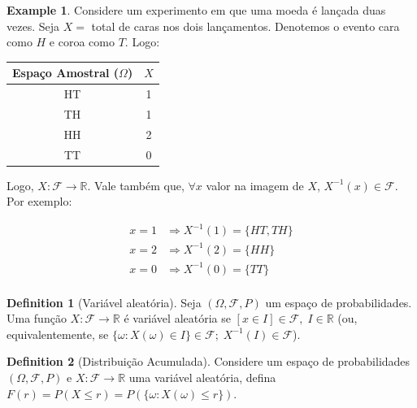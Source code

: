 \documentclass[
]{article}
\theoremstyle{definition}
\newtheorem{definition}{Definition}[section]
\theoremstyle{definition}
\newtheorem{example}{Example}[section]
\theoremstyle{definition}
\theoremstyle{definition}
\theoremstyle{remark}
\begin{document}
\begin{example}
Considere um experimento em que uma moeda é lançada duas vezes. Seja \(X =\) total de caras nos dois lançamentos. Denotemos o evento cara como \(H\) e coroa como \(T\). Logo:

\begin{center}
\begin{tabular}{|c|c|} \toprule
Espaço Amostral ($\Omega$) & $X$ \\ \midrule
HT & 1 \\
TH & 1 \\
HH & 2 \\
TT & 0 \\ \bottomrule
\end{tabular}
\end{center}

Logo, \(X:\mathcal{F} \to \mathbb{R}\). Vale também que, \(\forall x\) valor na imagem de \(X\), \(X^{-1}(x) \in \mathcal{F}\). Por exemplo:

\begin{align*}
x = 1 &\Rightarrow X^{-1}(1) = \{HT,TH\} \\
x = 2 &\Rightarrow X^{-1}(2) = \{HH\} \\
x = 0 &\Rightarrow X^{-1}(0) = \{TT\} \\
\end{align*}
\end{example}

\begin{definition}[Variável aleatória]
Seja \((\Omega,\mathcal{F},P)\) um espaço de probabilidades. Uma função \(X:\mathcal{F} \to \mathbb{R}\) é variável aleatória se \([x \in I] \in \mathcal{F}, \; I \in \mathbb{R}\) (ou, equivalentemente, se \(\{\omega:X(\omega) \in I\} \in \mathcal{F}; \; X^{-1}(I) \in \mathcal{F}\)).
\end{definition}

\begin{definition}[Distribuição Acumulada]
Considere um espaço de probabilidades \((\Omega,\mathcal{F},P)\) e \(X:\mathcal{F} \to \mathbb{R}\) uma variável aleatória, defina \(F(r) = P(X \le r) = P(\{\omega : X(\omega) \le r\})\).
\end{definition}
\end{document}

